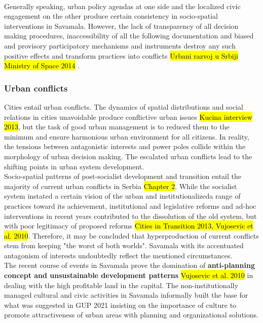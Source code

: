 \documentclass[11pt]{report}
\begin{document}
\\
Generally speaking, urban policy agendas at one side and the localized civic engagement on the other produce certain consistency in socio-spatial interventions in Savamala.
However, the lack of transparency of all decision making procedures, inaccessibility of all the following documentation and biased and provisory participatory mechanisms and instruments destroy any such positive effects and transform practices into conflicts \hl{Urbani razvoj u Srbiji Ministry of Space 2014} .

\subsubsection{Urban conflicts}

Cities entail urban conflicts. The dynamics of spatial distributions and social relations in cities unavoidable produce conflictive urban issues \hl{Kucina interview 2013}, but the task of good urban management is to reduced them to the minimum and ensure harmonious urban environment for all citizens.
In reality, the tensions between antagonistic interests and power poles collide within the morphology of urban decision making. The escalated urban conflicts lead to the shifting points in urban system development.
\\
Socio-spatial patterns of post-socialist development and transition entail the majority of current urban conflicts in Serbia \hl{Chapter 2}.
While the socialist system instated a certain vision of the urban and institutionalizeda range of practices toward its achievement, institutional and legislative reforms and ad-hoc interventions in recent years contributed to the dissolution of the old system, but with poor legitimacy of proposed reforms \hl{Cities in Transition 2013, Vujosevic et al. 2010}. Therefore, it may be concluded that hyperproduction of current conflicts stem from keeping "the worst of both worlds".
Savamala with its accentuated antagonism of interests undoubtedly reflect the mentioned circumstances.
\\
The recent course of events in Savamala prove the domination of \textbf{anti-planning concept and unsustainable development patterns} \hl{Vujosevic et al. 2010} in dealing with the high profitable land in the capital.
The non-institutionally managed cultural and civic activities in Savamala informally built the base for what was suggested in GUP 2021 insisting on the importance of culture to promote attractiveness of urban areas with planning and organizational solutions.
\end{document}
